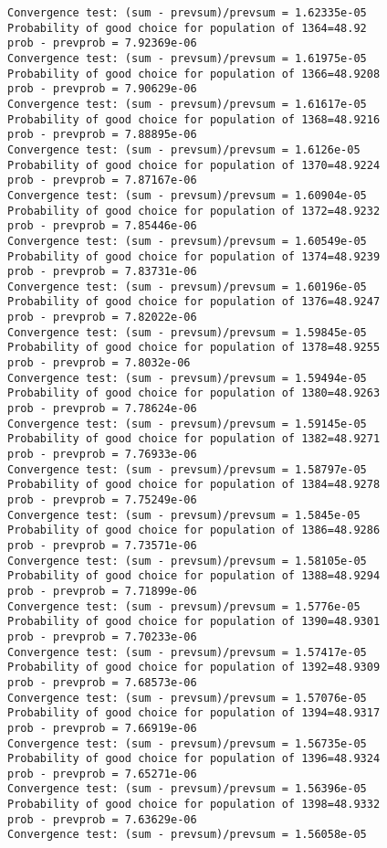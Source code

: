 \documentclass[11pt,onecolumn]{article}
\begin{document}
\begin{verbatim}
Convergence test: (sum - prevsum)/prevsum = 1.62335e-05
Probability of good choice for population of 1364=48.92
prob - prevprob = 7.92369e-06
Convergence test: (sum - prevsum)/prevsum = 1.61975e-05
Probability of good choice for population of 1366=48.9208
prob - prevprob = 7.90629e-06
Convergence test: (sum - prevsum)/prevsum = 1.61617e-05
Probability of good choice for population of 1368=48.9216
prob - prevprob = 7.88895e-06
Convergence test: (sum - prevsum)/prevsum = 1.6126e-05
Probability of good choice for population of 1370=48.9224
prob - prevprob = 7.87167e-06
Convergence test: (sum - prevsum)/prevsum = 1.60904e-05
Probability of good choice for population of 1372=48.9232
prob - prevprob = 7.85446e-06
Convergence test: (sum - prevsum)/prevsum = 1.60549e-05
Probability of good choice for population of 1374=48.9239
prob - prevprob = 7.83731e-06
Convergence test: (sum - prevsum)/prevsum = 1.60196e-05
Probability of good choice for population of 1376=48.9247
prob - prevprob = 7.82022e-06
Convergence test: (sum - prevsum)/prevsum = 1.59845e-05
Probability of good choice for population of 1378=48.9255
prob - prevprob = 7.8032e-06
Convergence test: (sum - prevsum)/prevsum = 1.59494e-05
Probability of good choice for population of 1380=48.9263
prob - prevprob = 7.78624e-06
Convergence test: (sum - prevsum)/prevsum = 1.59145e-05
Probability of good choice for population of 1382=48.9271
prob - prevprob = 7.76933e-06
Convergence test: (sum - prevsum)/prevsum = 1.58797e-05
Probability of good choice for population of 1384=48.9278
prob - prevprob = 7.75249e-06
Convergence test: (sum - prevsum)/prevsum = 1.5845e-05
Probability of good choice for population of 1386=48.9286
prob - prevprob = 7.73571e-06
Convergence test: (sum - prevsum)/prevsum = 1.58105e-05
Probability of good choice for population of 1388=48.9294
prob - prevprob = 7.71899e-06
Convergence test: (sum - prevsum)/prevsum = 1.5776e-05
Probability of good choice for population of 1390=48.9301
prob - prevprob = 7.70233e-06
Convergence test: (sum - prevsum)/prevsum = 1.57417e-05
Probability of good choice for population of 1392=48.9309
prob - prevprob = 7.68573e-06
Convergence test: (sum - prevsum)/prevsum = 1.57076e-05
Probability of good choice for population of 1394=48.9317
prob - prevprob = 7.66919e-06
Convergence test: (sum - prevsum)/prevsum = 1.56735e-05
Probability of good choice for population of 1396=48.9324
prob - prevprob = 7.65271e-06
Convergence test: (sum - prevsum)/prevsum = 1.56396e-05
Probability of good choice for population of 1398=48.9332
prob - prevprob = 7.63629e-06
Convergence test: (sum - prevsum)/prevsum = 1.56058e-05

\end{verbatim}
\end{document}
